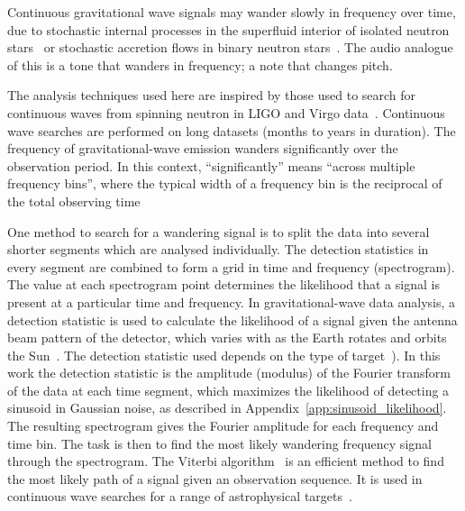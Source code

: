 \documentclass[paper-main.tex]{subfiles}
\begin{document}
Continuous gravitational wave signals may wander slowly in frequency over time, due to stochastic internal processes in the superfluid interior of isolated neutron stars~\cite{MelatosDouglassSimula:2015,Jones:2010} or stochastic accretion flows in binary neutron stars~\cite{BildstenTB:1998}. 
The audio analogue of this is a tone that wanders in frequency; a note that changes pitch. 


The analysis techniques used here are inspired by those used to search for continuous waves from spinning neutron in LIGO and Virgo data~\cite{SuvorovaEtAl:2016,SuvorovaEtAl:2017}.
Continuous wave searches are performed on long datasets (months to years in duration). 
The frequency of gravitational-wave emission wanders significantly over the observation period. 
In this context, ``significantly'' means ``across multiple frequency bins'', where the typical width of a frequency bin is the reciprocal of the total observing time~\cite{JKS:1998,ScoX1O2Viterbi:2019}

One method to search for a wandering signal is to split the data into several shorter segments which are analysed individually. 
The detection statistics in every segment are combined to form a grid in time and frequency (spectrogram). 
The value at each spectrogram point determines the likelihood that a signal is present at a particular time and frequency. 
In gravitational-wave data analysis, a detection statistic is used to calculate the likelihood of a signal given the antenna beam pattern of the detector, which varies with as the Earth rotates and orbits the Sun~\cite{JKS:1998}.
The detection statistic used depends on the type of target~\cite{JKS:1998,SuvorovaEtAl:2017}). 
In this work the detection statistic is the amplitude (modulus) of the Fourier transform of the data at each time segment, which maximizes the likelihood of detecting a sinusoid in Gaussian noise, as described in Appendix~\ref{app:sinusoid_likelihood}. 
The resulting spectrogram gives the Fourier amplitude for each frequency and time bin. 
The task is then to find the most likely wandering frequency signal through the spectrogram. 
The Viterbi algorithm~\cite{Viterbi:1967} is an efficient method to find the most likely path of a signal given an observation sequence. 
It is used in continuous wave searches for a range of astrophysical targets~\cite{ScoX1O2Viterbi:2019,ScoX1ViterbiO1:2017,MillhouseStrangMelatos:2020,PostMergerRemnantSearch:2019,SunEtAlSNR:2018,viterbi_application}. 
 
\end{document}
